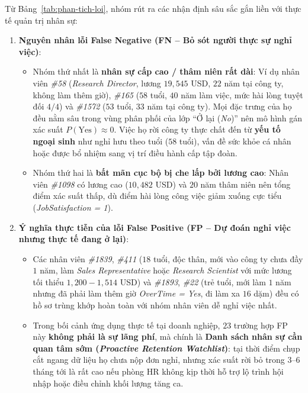 Từ Bảng~\ref{tab:phan-tich-loi}, nhóm rút ra các nhận định sâu sắc gắn liền với thực tế quản trị nhân sự:
\begin{enumerate}
    \item \textbf{Nguyên nhân lỗi False Negative (FN -- Bỏ sót người thực sự nghỉ việc)}:
    \begin{itemize}
        \item Nhóm thứ nhất là \textbf{nhân sự cấp cao / thâm niên rất dài}: Ví dụ nhân viên \textit{\#58} (\textit{Research Director}, lương $19,545$ USD, $22$ năm tại công ty, không làm thêm giờ), \textit{\#165} ($58$ tuổi, $40$ năm làm việc, mức hài lòng tuyệt đối $4/4$) và \textit{\#1572} ($53$ tuổi, $33$ năm tại công ty). Mọi đặc trưng của họ đều nằm sâu trong vùng phân phối của lớp ``Ở lại (\textit{No})'' nên mô hình gán xác suất $P(\text{Yes}) \approx 0$. Việc họ rời công ty thực chất đến từ \textbf{yếu tố ngoại sinh} như nghỉ hưu theo tuổi ($58$ tuổi), vấn đề sức khỏe cá nhân hoặc được bổ nhiệm sang vị trí điều hành cấp tập đoàn.
        \item Nhóm thứ hai là \textbf{bất mãn cục bộ bị che lấp bởi lương cao}: Nhân viên \textit{\#1098} có lương cao ($10,482$ USD) và $20$ năm thâm niên nên tổng điểm xác suất thấp, dù điểm hài lòng công việc giảm xuống cực tiểu (\textit{JobSatisfaction = 1}).
    \end{itemize}
    \item \textbf{Ý nghĩa thực tiễn của lỗi False Positive (FP -- Dự đoán nghỉ việc nhưng thực tế đang ở lại)}:
    \begin{itemize}
        \item Các nhân viên \textit{\#1839}, \textit{\#411} ($18$ tuổi, độc thân, mới vào công ty chưa đầy $1$ năm, làm \textit{Sales Representative} hoặc \textit{Research Scientist} với mức lương tối thiểu $1,200 - 1,514$ USD) và \textit{\#1893}, \textit{\#22} (trẻ tuổi, mới làm $1$ năm nhưng đã phải làm thêm giờ \textit{OverTime = Yes}, đi làm xa $16$ dặm) đều có hồ sơ trùng khớp hoàn toàn với nhóm nhân viên dễ nghỉ việc nhất.
        \item Trong bối cảnh ứng dụng thực tế tại doanh nghiệp, $23$ trường hợp FP này \textbf{không phải là sự lãng phí}, mà chính là \textbf{Danh sách nhân sự cần quan tâm sớm (\textit{Proactive Retention Watchlist})}: tại thời điểm chụp cắt ngang dữ liệu họ chưa nộp đơn nghỉ, nhưng xác suất rời bỏ trong $3$--$6$ tháng tới là rất cao nếu phòng HR không kịp thời hỗ trợ lộ trình hội nhập hoặc điều chỉnh khối lượng tăng ca.
    \end{itemize}
\end{enumerate}


